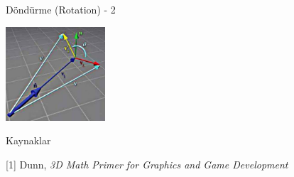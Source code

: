 \documentclass[12pt,fleqn]{article}\usepackage{../../common}
\begin{document}
Döndürme (Rotation) - 2

\includegraphics[width=10em]{phy_073_rot_01.jpg}







Kaynaklar

[1] Dunn, {\em 3D Math Primer for Graphics and Game Development}
\end{document}
